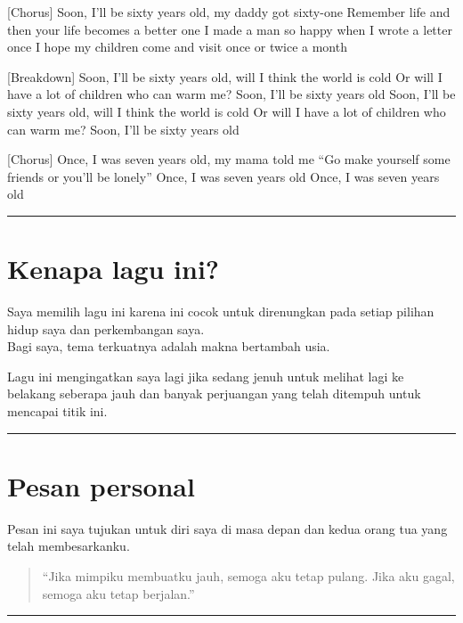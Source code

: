 \documentclass[
  letterpaper,
  DIV=11,
  numbers=noendperiod]{scrreprt}
\begin{document}
{[}Chorus{]} Soon, I'll be sixty years old, my daddy got sixty-one
Remember life and then your life becomes a better one I made a man so
happy when I wrote a letter once I hope my children come and visit once
or twice a month

{[}Breakdown{]} Soon, I'll be sixty years old, will I think the world is
cold Or will I have a lot of children who can warm me? Soon, I'll be
sixty years old Soon, I'll be sixty years old, will I think the world is
cold Or will I have a lot of children who can warm me? Soon, I'll be
sixty years old

{[}Chorus{]} Once, I was seven years old, my mama told me ``Go make
yourself some friends or you'll be lonely'' Once, I was seven years old
Once, I was seven years old

\begin{center}\rule{0.5\linewidth}{0.5pt}\end{center}

\section{Kenapa lagu ini?}\label{kenapa-lagu-ini}

Saya memilih lagu ini karena ini cocok untuk direnungkan pada setiap
pilihan hidup saya dan perkembangan saya.\\
Bagi saya, tema terkuatnya adalah makna bertambah usia.

Lagu ini mengingatkan saya lagi jika sedang jenuh untuk melihat lagi ke
belakang seberapa jauh dan banyak perjuangan yang telah ditempuh untuk
mencapai titik ini.

\begin{center}\rule{0.5\linewidth}{0.5pt}\end{center}

\section{Pesan personal}\label{pesan-personal}

Pesan ini saya tujukan untuk diri saya di masa depan dan kedua orang tua
yang telah membesarkanku.

\begin{quote}
``Jika mimpiku membuatku jauh, semoga aku tetap pulang. Jika aku gagal,
semoga aku tetap berjalan.''
\end{quote}

\begin{center}\rule{0.5\linewidth}{0.5pt}\end{center}
\end{document}
